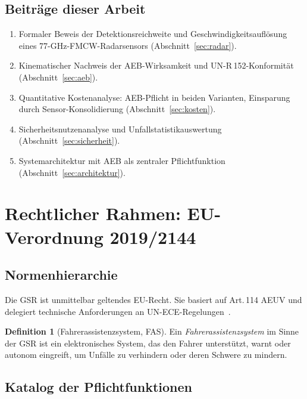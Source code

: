 ﻿\documentclass[a4paper,12pt]{article}
\theoremstyle{definition}
\newtheorem{definition}{Definition}
\begin{document}
\subsection{Beitr\"age dieser Arbeit}

\begin{enumerate}
  \item Formaler Beweis der Detektionsreichweite und Geschwindigkeitsaufl\"osung
        eines 77-GHz-FMCW-Radarsensors (Abschnitt~\ref{sec:radar}).
  \item Kinematischer Nachweis der AEB-Wirksamkeit und UN-R\,152-Konformit\"at
        (Abschnitt~\ref{sec:aeb}).
  \item Quantitative Kostenanalyse: AEB-Pflicht in beiden Varianten, Einsparung
        durch Sensor-Konsolidierung (Abschnitt~\ref{sec:kosten}).
  \item Sicherheitsnutzenanalyse und Unfallstatistikauswertung
        (Abschnitt~\ref{sec:sicherheit}).
  \item Systemarchitektur mit AEB als zentraler Pflichtfunktion
        (Abschnitt~\ref{sec:architektur}).
\end{enumerate}

\section{Rechtlicher Rahmen: EU-Verordnung 2019/2144}
\label{sec:rechtlich}

\subsection{Normenhierarchie}

Die GSR ist unmittelbar geltendes EU-Recht. Sie basiert auf Art.\,114 AEUV
und delegiert technische Anforderungen an UN-ECE-Regelungen~\cite{unece2021}.

\begin{definition}[Fahrerassistenzsystem, FAS]
Ein \emph{Fahrerassistenzsystem} im Sinne der GSR ist ein elektronisches
System, das den Fahrer unterst\"utzt, warnt oder autonom eingreift, um
Unf\"alle zu verhindern oder deren Schwere zu mindern.
\end{definition}

\subsection{Katalog der Pflichtfunktionen}
\end{document}
